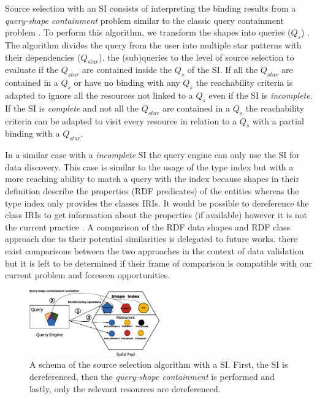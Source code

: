 Source selection with an SI consists of interpreting the binding results from a \emph{query-shape containment} problem similar to the classic query containment problem \cite{afariQCE, Spasi2023}.
To perform this algorithm, we transform the shapes into queries ($Q_{s}$) \cite{labragayo2017validating, Corman2019, Delva2021}.
The algorithm divides the query from the user into multiple star patterns with their dependencies ($Q_{star}$).
 \cite{Yang2021FlexPushdownDBHP} the (sub)queries to the level of source selection to evaluate if the $Q_{star}$ are contained inside the $Q_s$ of the SI.
If all the $Q_{star}$ are contained in a $Q_{s}$ or have no binding with any $Q_{s}$
the reachability criteria is adapted to ignore all the resources not linked to a $Q_{s}$ even if the SI is \emph{incomplete}.
If the SI is \emph{complete} and not all the $Q_{star}$ are contained in a $Q_{s}$ the reachability criteria can be adapted
to visit every resource in relation to a $Q_{s}$ with a partial binding with a $Q_{star}$.

In a similar case with a \emph{incomplete} SI the query engine can only use the SI for data discovery.
This case is similar to the usage of the type index but with a more reaching ability to match a query with the index 
because shapes in their definition describe the properties (RDF predicates) of the entities whereas the type index only provides the classes IRIs.
It would be possible to dereference the class IRIs to get information about the properties (if available) however it is not the current practice \cite{Taelman2023}.
A comparison of the RDF data shapes and RDF class approach due to their potential similarities is delegated to future works.
 there exist comparisons 
between the two approaches in the context of data validation~\cite{demeester_swj_2021} but it is left to be determined if their frame of comparison is compatible with our current problem
and foreseen opportunities.

\begin{figure}
    \centering
    \includegraphics[width=0.5\textwidth]{figure/shape_containement}
    \caption{A schema of the source selection algorithm with a SI. First, the SI is dereferenced, 
    then the \emph{query-shape containment} is performed and lastly, only the relevant resources are dereferenced.}
    \label{fig:shape_index}
\end{figure}
